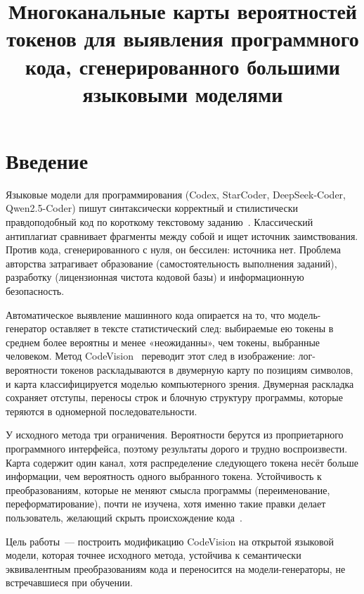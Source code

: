 \documentclass{misisarticle}
\title{Многоканальные карты вероятностей токенов для выявления программного кода, сгенерированного большими языковыми моделями}
\begin{document}
\maketitle

\section{Введение}

Языковые модели для программирования (Codex, StarCoder, DeepSeek-Coder, Qwen2.5-Coder) пишут синтаксически корректный и стилистически правдоподобный код по короткому текстовому заданию~\cite{qwen25coder, deepseekcoder}. Классический антиплагиат сравнивает фрагменты между собой и ищет источник заимствования. Против кода, сгенерированного с нуля, он бессилен: источника нет. Проблема авторства затрагивает образование (самостоятельность выполнения заданий), разработку (лицензионная чистота кодовой базы) и информационную безопасность.

Автоматическое выявление машинного кода опирается на то, что модель-генератор оставляет в тексте статистический след: выбираемые ею токены в среднем более вероятны и менее «неожиданны», чем токены, выбранные человеком. Метод CodeVision~\cite{codevision} переводит этот след в изображение: лог-вероятности токенов раскладываются в двумерную карту по позициям символов, и карта классифицируется моделью компьютерного зрения. Двумерная раскладка сохраняет отступы, переносы строк и блочную структуру программы, которые теряются в одномерной последовательности.

У исходного метода три ограничения. Вероятности берутся из проприетарного программного интерфейса, поэтому результаты дорого и трудно воспроизвести. Карта содержит один канал, хотя распределение следующего токена несёт больше информации, чем вероятность одного выбранного токена. Устойчивость к преобразованиям, которые не меняют смысла программы (переименование, переформатирование), почти не изучена, хотя именно такие правки делает пользователь, желающий скрыть происхождение кода~\cite{codegptsensor}.

Цель работы~--- построить модификацию CodeVision на открытой языковой модели, которая точнее исходного метода, устойчива к семантически эквивалентным преобразованиям кода и переносится на модели-генераторы, не встречавшиеся при обучении.
\end{document}
